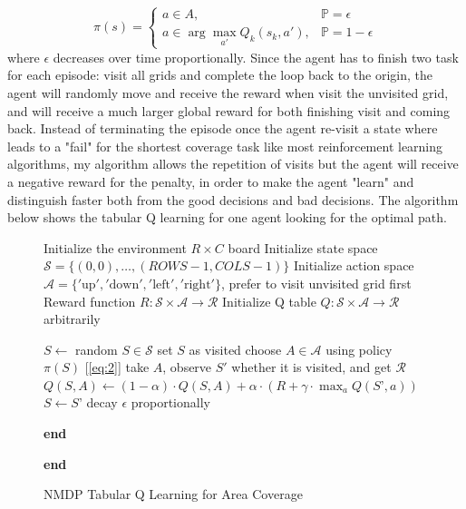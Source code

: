 \documentclass{article}
\begin{document}
\begin{equation}
\label{eq:2}
    \pi(s)=\left\{\begin{array}{ll} a \in A, & \mathbb{P} = \epsilon \\ a \in \arg \max _{a\prime} Q_{k}\left(s_{k}, a\prime\right), & \mathbb{P} = 1-\epsilon \end{array}\right.
\end{equation}
where $\epsilon$ decreases over time proportionally. Since the agent has to finish two task for each episode: visit all grids and complete the loop back to the origin, the agent will randomly move and receive the reward when visit the unvisited grid, and will receive a much larger global reward for both finishing visit and coming back. Instead of terminating the episode once the agent re-visit a state where leads to a "fail" for the shortest coverage task like most reinforcement learning algorithms, my algorithm allows the repetition of visits but the agent will receive a negative reward for the penalty, in order to make the agent "learn" and distinguish faster both from the good decisions and bad decisions\cite{rl_sutton}. The algorithm below shows the tabular Q learning for one agent looking for the optimal path.
\begin{figure}[H]
  \centering
  \begin{minipage}{.7\linewidth}
  
\begin{algorithm}[H]
\caption{NMDP Tabular Q Learning for Area Coverage} 

\begin{algorithmic}[1]
\State Initialize the environment $R\times C$ board
\State Initialize state space $\mathcal{S} = \{(0,0), \dots, (ROWS-1, COLS-1)\}$
\State Initialize action space $\mathcal{A} = \{'\text{up}', '\text{down}', '\text{left}', '\text{right}'\}$, prefer to visit unvisited grid first
\State Reward function $R: \mathcal{S} \times \mathcal{A} \rightarrow \mathcal{R}$
\State Initialize Q table $Q: \mathcal{S} \times \mathcal{A} \rightarrow \mathcal{R}$ arbitrarily 

    \State $S  \gets$ random $S \in \mathcal{S}$
        \State set $S$ as visited
        \State choose $A \in \mathcal{A}$ using policy $\pi(S)$ [\ref{eq:2}]
        \State take $A$, observe $S'$ whether it is visited, and get $\mathcal{R}$
        \State $Q(S, A) \gets (1-\alpha) \cdot Q(S, A) + \alpha \cdot (R + \gamma \cdot \max_{a} Q(S’, a))$
        \State $S \gets S’$
        \State decay $\epsilon$ proportionally
        \EndWhile
        
\State \textbf{end}
    \EndWhile
    
\State \textbf{end}
        
\end{algorithmic}
\end{algorithm}

  \end{minipage}
\end{figure}
\end{document}
